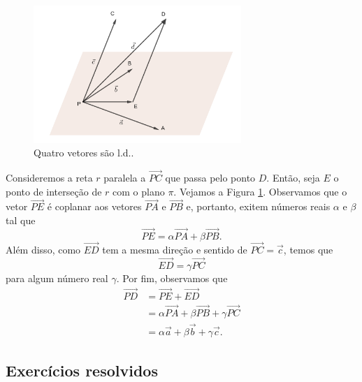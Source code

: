 \begin{figure}[H]
  \centering
  \includegraphics[width=0.7\textwidth]{./cap_base/dados/fig_4vec_ld/fig_4vec_ld}
  \caption{Quatro vetores são l.d..}
  \label{fig:4vec_ld}
\end{figure}

Consideremos a reta $r$ paralela a $\overrightarrow{PC}$ que passa pelo ponto $D$. Então, seja $E$ o ponto de interseção de $r$ com o plano $\pi$. Vejamos a Figura \ref{fig:4vec_ld}. Observamos que o vetor $\overrightarrow{PE}$ é coplanar aos vetores $\overrightarrow{PA}$ e $\overrightarrow{PB}$ e, portanto, exitem números reais $\alpha$ e $\beta$ tal que
\begin{equation}
  \overrightarrow{PE} = \alpha\overrightarrow{PA} + \beta\overrightarrow{PB}.
\end{equation}
Além disso, como $\overrightarrow{ED}$ tem a mesma direção e sentido de $\overrightarrow{PC} = \vec{c}$, temos que
\begin{equation}
  \overrightarrow{ED} = \gamma\overrightarrow{PC}
\end{equation}
para algum número real $\gamma$. Por fim, observamos que
\begin{align*}
  \overrightarrow{PD} &= \overrightarrow{PE} + \overrightarrow{ED}\\
                      &= \alpha\overrightarrow{PA} + \beta\overrightarrow{PB} + \gamma\overrightarrow{PC}\\
                      &= \alpha\vec{a} + \beta\vec{b} + \gamma\vec{c}.
\end{align*}

\subsection*{Exercícios resolvidos}

